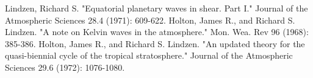 \documentclass[UTF8]{ctexart}
\begin{document}
	
	

\begin{thebibliography}{99}
	 Lindzen, Richard S. "Equatorial planetary waves in shear. Part I." Journal of the Atmospheric Sciences 28.4 (1971): 609-622.
	 Holton, James R., and Richard S. Lindzen. "A note on Kelvin waves in the atmosphere." Mon. Wea. Rev 96 (1968): 385-386.
	 Holton, James R., and Richard S. Lindzen. "An updated theory for the quasi-biennial cycle of the tropical stratosphere." Journal of the Atmospheric Sciences 29.6 (1972): 1076-1080.
\end{thebibliography}
\end{document}
